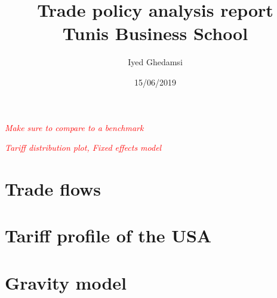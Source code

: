 \documentclass[12pt]{article}
\title{Trade policy analysis report\\
\large Tunis Business School}
\author{Iyed Ghedamsi}
\date{15/06/2019}
\newcommand{\comm}[1] {\begin{small}\textcolor{red}{\textit{#1}}\end{small}\newline}
\begin{document}
\maketitle

\newpage

\tableofcontents

\newpage


\comm{Make sure to compare to a benchmark}

\comm{Tariff distribution plot, Fixed effects model}



\section{Trade flows}


\section{Tariff profile of the USA}


\section{Gravity model}

\newpage
\printbibliography
\end{document}
